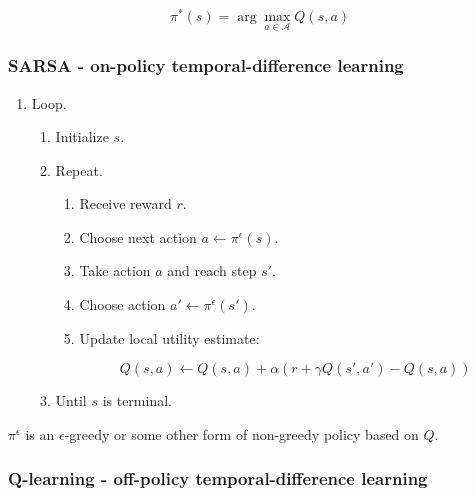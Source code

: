 		$$\pi^*(s) = \arg\max\limits_{a\in\mathcal{A}}Q(s,a)$$

		\subsubsection{SARSA - on-policy temporal-difference learning}

		\begin{enumerate}
			\item Loop.

				\begin{enumerate}
					\item Initialize $s$.
					\item Repeat.

						\begin{enumerate}
							\item Receive reward $r$.
							\item Choose next action $a\leftarrow\pi^\epsilon(s)$.
							\item Take action $a$ and reach step $s'$.
							\item Choose action $a'\leftarrow\pi^\epsilon(s')$.
							\item Update local utility estimate:

								$$Q(s,a) \leftarrow Q(s,a) + \alpha(r+\gamma Q(s',a')- Q(s,a))$$

						\end{enumerate}

					\item Until $s$ is terminal.
				\end{enumerate}

		\end{enumerate}

		$\pi^\epsilon$ is an $\epsilon$-greedy or some other form of non-greedy policy based on $Q$.

		\subsubsection{Q-learning - off-policy temporal-difference learning}

